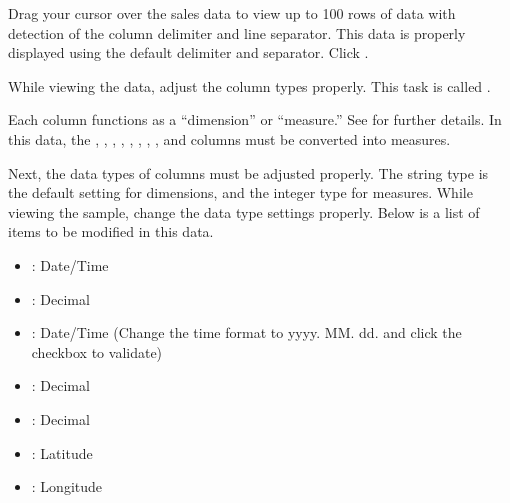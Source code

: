 \documentclass[letterpaper,10pt,english]{sphinxmanual}
\begin{document}
Drag your cursor over the sales data to view up to 100 rows of data with detection of the column delimiter and line separator. This data is properly displayed using the default delimiter and separator. Click .
\begin{quote}

\begin{figure}[H]
\centering

\noindent{}
\end{figure}
\end{quote}

While viewing the data, adjust the column types properly. This task is called .
\begin{quote}

\begin{figure}[H]
\centering

\noindent{}
\end{figure}
\end{quote}

Each column functions as a “dimension” or “measure.” See {\hyperref[\detokenize{discovery/part02/dimension_and_measures::doc}]{}} for further details. In this data, the , , , , , , , , and  columns must be converted into measures.

Next, the data types of columns must be adjusted properly. The string type is the default setting for dimensions, and the integer type for measures. While viewing the sample, change the data type settings properly. Below is a list of items to be modified in this data.
\begin{itemize}
\item {} 
 : Date/Time

\item {} 
 : Decimal

\item {} 
 : Date/Time (Change the time format to yyyy. MM. dd. and click the checkbox to validate)

\item {} 
 : Decimal

\item {} 
 : Decimal

\item {} 
 : Latitude

\item {} 
 : Longitude

\end{itemize}
\end{document}
